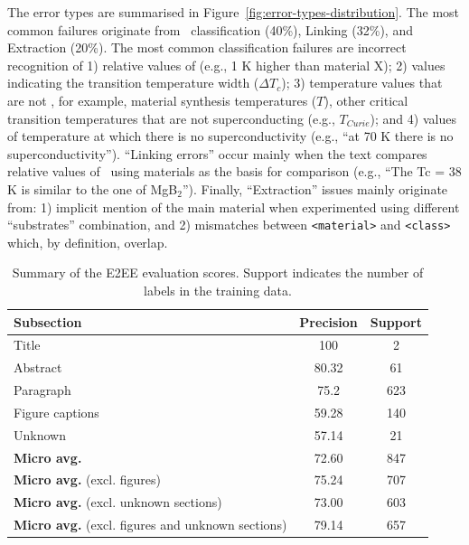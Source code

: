 The error types are summarised in Figure~\ref{fig:error-types-distribution}. The most common failures originate from \tc~classification (40\%), Linking (32\%), and Extraction (20\%).
The most common \tc classification failures are incorrect recognition of 1) relative values of \tc (e.g., 1 K higher than material X); 2) values indicating the transition temperature width ($\Delta T_{c}$); 3) temperature values that are not \tc, for example, material synthesis temperatures ($T$), other critical transition temperatures that are not superconducting (e.g., $T_{Curie}$); and 4) values of temperature at which there is no superconductivity (e.g., ``at 70 K there is no superconductivity'').
``Linking errors'' occur mainly when the text compares relative values of \tc~using materials as the basis for comparison (e.g., ``The Tc = 38 K is similar to the one of MgB$_{2}$'').
Finally, ``Extraction'' issues mainly originate from: 1) implicit mention of the main material when experimented using different ``substrates'' combination, and 2) mismatches between \texttt{<material>} and \texttt{<class>} which, by definition, overlap.


\begin{table}[htbp]
    \centering
    \caption{Summary of the E2EE evaluation scores. Support indicates the number of labels in the training data.}
    \begin{tabular}{l c c}
        \toprule
        \textbf{Subsection}                                      & \textbf{Precision} & \textbf{Support} \\
        \midrule
        Title                                                    & 100                & 2                \\
        Abstract                                                 & 80.32              & 61               \\
        Paragraph                                                & 75.2               & 623              \\
        Figure captions                                          & 59.28              & 140              \\
        Unknown                                                  & 57.14              & 21               \\
        \midrule
        \textbf{Micro avg.}                                      & 72.60              & 847              \\
        \textbf{Micro avg.} (excl. figures)                      & 75.24              & 707              \\
        \textbf{Micro avg.} (excl. unknown sections)             & 73.00              & 603              \\
        \textbf{Micro avg.} (excl. figures and unknown sections) & 79.14              & 657              \\
        \bottomrule
    \end{tabular}
    
    \label{table:end2end-evaluation-summary}
\end{table}

